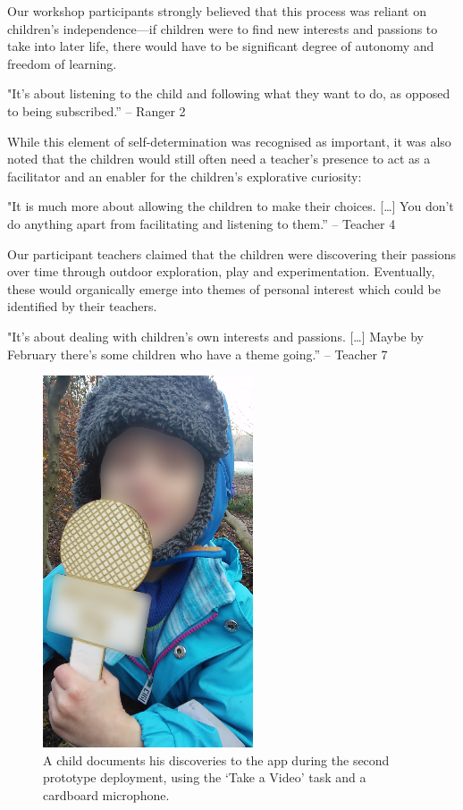 Our workshop participants strongly believed that this process was reliant on children’s independence—if children were to find new interests and passions to take into later life, there would have to be significant degree of autonomy and freedom of learning. 

\begin{displayquote}
"It's about listening to the child and following what they want to do, as opposed to being subscribed.” – Ranger 2
\end{displayquote}

While this element of self-determination was recognised as important, it was also noted that the children would still often need a teacher’s presence to act as a facilitator and an enabler for the children’s explorative curiosity:

\begin{displayquote}
"It is much more about allowing the children to make their choices. […] You don’t do anything apart from facilitating and listening to them.” – Teacher 4
\end{displayquote}

Our participant teachers claimed that the children were discovering their passions over time through outdoor exploration, play and experimentation. Eventually, these would organically emerge into themes of personal interest which could be identified by their teachers.

\begin{displayquote}
"It’s about dealing with children’s own interests and passions. […] Maybe by February there’s some children who have a theme going.” – Teacher 7
\end{displayquote}

\begin{figure}
  \centering
  \includegraphics[width=0.4\columnwidth]{images/chapter04/microphone.png}
  \caption[A child completing a `Take a Video' Task]{A child documents his discoveries to the app during the second prototype deployment, using the `Take a Video' task and a cardboard microphone.}
  \label{fig:prototypeMicrophone}
\end{figure}

